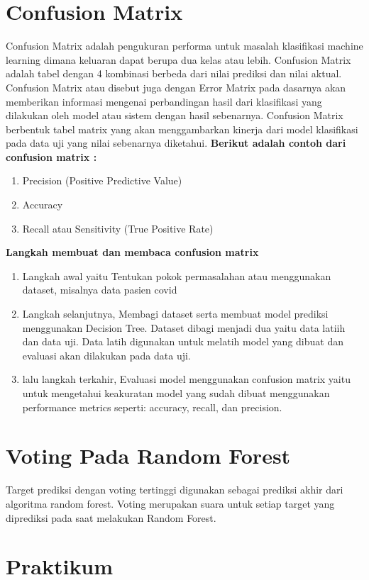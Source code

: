 \section{Confusion Matrix}
Confusion Matrix adalah pengukuran performa untuk masalah klasifikasi machine learning dimana keluaran dapat berupa dua kelas atau lebih. Confusion Matrix adalah tabel dengan 4 kombinasi berbeda dari nilai prediksi dan nilai aktual. Confusion Matrix atau disebut juga dengan Error Matrix pada dasarnya akan memberikan informasi mengenai perbandingan hasil dari klasifikasi yang dilakukan oleh model atau sistem dengan hasil sebenarnya. Confusion Matrix berbentuk tabel matrix yang akan menggambarkan kinerja dari model klasifikasi pada data uji yang nilai sebenarnya diketahui.
\newline
\textbf {Berikut adalah contoh dari confusion matrix :}
\begin{enumerate}
    \item Precision (Positive Predictive Value)
    \item Accuracy
    \item Recall atau Sensitivity (True Positive Rate)
\end{enumerate}
\textbf {Langkah membuat dan membaca confusion matrix}
\begin{enumerate}
    \item Langkah awal yaitu Tentukan pokok permasalahan atau menggunakan dataset, misalnya data pasien covid
    \item Langkah selanjutnya, Membagi dataset serta membuat model prediksi menggunakan Decision Tree. Dataset dibagi menjadi dua yaitu data latiih dan data uji. Data latih digunakan untuk melatih model yang dibuat dan evaluasi akan dilakukan pada data uji.
    \item lalu langkah terkahir, Evaluasi model menggunakan confusion matrix yaitu untuk mengetahui keakuratan model yang sudah dibuat menggunakan performance metrics seperti: accuracy, recall, dan precision.
\end{enumerate}

\section{Voting Pada Random Forest}
Target prediksi dengan voting tertinggi digunakan sebagai prediksi akhir dari algoritma random forest. Voting merupakan suara untuk setiap target yang diprediksi pada saat melakukan Random Forest.

\section{Praktikum}
